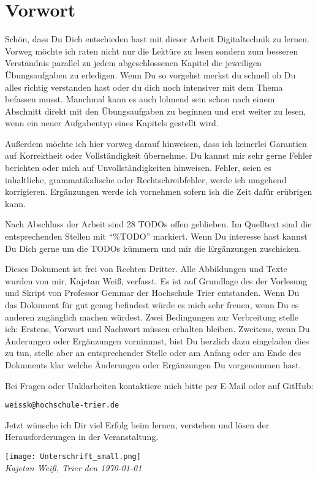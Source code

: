 \chapter*{Vorwort}
Schön, dass Du Dich entschieden hast mit dieser Arbeit Digitaltechnik zu lernen. Vorweg möchte ich raten nicht nur die Lektüre zu lesen sondern zum besseren Verständnis parallel zu jedem abgeschlossenen Kapitel die jeweiligen Übungsaufgaben zu erledigen. Wenn Du so vorgehst merkst du schnell ob Du alles richtig verstanden hast oder du dich noch intensiver mit dem Thema befassen musst. Manchmal kann es auch lohnend sein schon nach einem Abschnitt direkt mit den Übungsaufgaben zu beginnen und erst weiter zu lesen, wenn ein neuer Aufgabentyp eines Kapitels gestellt wird.

Außerdem möchte ich hier vorweg darauf hinweisen, dass ich keinerlei Garantien auf Korrektheit oder Vollständigkeit übernehme. Du kannst mir sehr gerne Fehler berichten oder mich auf Unvollständigkeiten hinweisen. Fehler, seien es inhaltliche, grammatikalische oder Rechtschreibfehler, werde ich umgehend korrigieren. Ergänzungen werde ich vornehmen sofern ich die Zeit dafür erübrigen kann.

Nach Abschluss der Arbeit sind 28 TODOs offen geblieben. Im Quelltext sind die entsprechenden Stellen mit "`\%TODO"' markiert. Wenn Du interesse hast kannst Du Dich gerne um die TODOs kümmern und mir die Ergänzungen zuschicken.

Dieses Dokument ist frei von Rechten Dritter. Alle Abbildungen und Texte wurden von mir, Kajetan Weiß, verfasst. Es ist auf Grundlage des der Vorlesung und Skript von Professor Gemmar der Hochschule Trier entstanden. Wenn Du das Dokument für gut genug befindest würde es mich sehr freuen, wenn Du es anderen zugänglich machen würdest. Zwei Bedingungen zur Verbreitung stelle ich: Erstens, Vorwort und Nachwort müssen erhalten bleiben. Zweitens, wenn Du Änderungen oder Ergänzungen vornimmst, bist Du herzlich dazu eingeladen dies zu tun, stelle aber an entsprechender Stelle oder am Anfang oder am Ende des Dokuments klar welche Änderungen oder Ergänzungen Du vorgenommen hast.

Bei Fragen oder Unklarheiten kontaktiere mich bitte per E-Mail oder auf GitHub:
\begin{center}
	\texttt{weissk@hochschule-trier.de}
\end{center}

Jetzt wünsche ich Dir viel Erfolg beim lernen, verstehen und lösen der Herausforderungen in der Veranstaltung.

\texttt{[image: Unterschrift\_small.png]}\\
\textsl{Kajetan Weiß, Trier den \today}